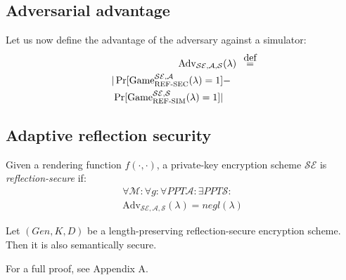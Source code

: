 \subsection{Adversarial advantage}\label{subsec:refsecadv}

Let us now define the advantage of the adversary against a simulator:
\begin{align*}
    \text{Adv}_{\mathcal{SE}, \mathcal{A}, \mathcal{S}}&(\lambda) &\defeq\\
    |\Pr[\text{Game}_{\text{REF-SEC}}^{\mathcal{SE},\mathcal{A}}(\lambda) = 1] &-\\
    \Pr[\text{Game}_{\text{REF-SIM}}^{\mathcal{SE},\mathcal{S}}(\lambda) = 1]| &
\end{align*}

\subsection{Adaptive reflection security}\label{subsec:adaptiverefsec}

Given a rendering function $f(\cdot, \cdot)$, a private-key encryption
scheme $\mathcal{SE}$ is \textit{reflection-secure} if:
\begin{align*}
    \forall \mathcal{M}:
    \forall g:
    \forall PPT \mathcal{A}:
    \exists PPT \mathcal{S}:\\
    \text{Adv}_{\mathcal{SE}, \mathcal{A}, \mathcal{S}}(\lambda) = negl(\lambda)
\end{align*}

\begin{lemma}
    Let $(Gen, K, D)$ be a length-preserving reflection-secure encryption
    scheme. Then it is also semantically secure.
\end{lemma}

For a full proof, see Appendix A.
